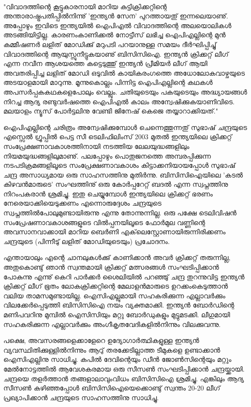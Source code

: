 ﻿
\vskip 2pt

‌\begin{framed}
"വിവാദത്തിന്റെ കൂട്ടുകാരനായി മാറിയ കുട്ടിക്രിക്കറ്റിന്റെ അന്താരാഷ്ട്രപതിപ്പില്‍നിന്നു് 'ഇന്ത്യന്‍ സേന' പുറത്തായതു് 
ഇന്നലെയാണു്. അപ്പോഴും ഇവിടെ ഇന്ത്യയില്‍ ഐപിഎല്‍ വിവാദത്തിന്റെ അലയൊലികള്‍ അടങ്ങിയിട്ടില്ല. 
കാരണംകാണിക്കല്‍ നോട്ടീസ് ലഭിച്ച ഐപിഎല്ലിന്റെ മുന്‍ കമ്മീഷണര്‍ ലളിത് മോഡിക്കു് മറുപടി പറയാനുള്ള 
സമയം ദീര്‍ഘിപ്പിച്ചു് വിവാദത്തിന്റെ ആയുസ്സുനീട്ടുകയാണു് ബിസിസിഐ. ഇന്ത്യന്‍ ക്രിക്കറ്റ് ലീഗ് എന്ന നവീന 
ആശയത്തെ കട്ടെടുത്തു് ഇന്ത്യന്‍ പ്രീമിയര്‍ ലീഗ് ആയി അവതരിപ്പിച്ച ലളിത് മോഡി ഒടുവില്‍ കായികരംഗത്തെ 
അധോലോകവാഴ്ചയുടെ അടയാളമായി മാറുന്നു. മൂന്നുകൊല്ലം പിന്നിട്ട ഐപിഎല്ലിന്റെ കഥകള്‍ 
അപസര്‍പ്പകകഥകളെപോലും വെല്ലും. ചതിയുടെയും പകയുടെയും അദ്ധ്യായങ്ങള്‍ നിറച്ച ആദ്യ രണ്ടുവര്‍ഷത്തെ ഐപിഎല്‍ കാലം 
അന്വേഷിക്കുകയാണിവിടെ.  മലയാളം ന്യൂസ് പോര്‍ട്ടലിനു വേണ്ടി ജിനേഷ് കെജെ തയ്യാറാക്കിയത്."
\end{framed}

{\vskip 12pt}

ഐപിഎല്ലിന്റെ ചരിത്രം അന്വേഷിക്കുമ്പോള്‍ ചെന്നെത്തുന്നതു് സുഭാഷ് ചന്ദ്രയുടെ എസ്സെല്‍ ഗ്രൂപ്പില്‍ പെട്ട സീ ടെലിഫിലിംസ് 
2003 മുതല്‍ ഇന്ത്യയിലെ ക്രിക്കറ്റ് സംപ്രേക്ഷണാവകാശത്തിനായി നടത്തിയ ലേലയുദ്ധങ്ങളിലും നിയമയുദ്ധങ്ങളിലുമാണു്. 
പലപ്പോഴും പൊതുജനത്തെ അമ്പരപ്പിക്കുന്ന നടപടിക്രമങ്ങളിലൂടെ സംപ്രേക്ഷണാവകാശം കിട്ടാക്കനിയായപ്പോള്‍ 
സുഭാഷ് ചന്ദ്ര അസാധ്യമായ ഒരു സാഹസത്തിനു മുതിര്‍ന്നു. ബിസിസിഐയിലെ 'കടല്‍ കിഴവന്‍മാരുടെ' സംഘത്തിനു് 
ഒരു കോര്‍പ്പറേറ്റ് ബദല്‍ എന്ന സ്വപ്നത്തിനു നിറംപകരാന്‍ ശ്രമിച്ചു. ഇതു ചെയ്യുമ്പോള്‍ ഇന്ത്യയിലെ ക്രിക്കറ്റ് ഭരണം 
നേരെയാക്കിയെടുക്കണം എന്നൊരുദ്ദേശം ചന്ദ്രയുടെ സ്വപ്നത്തില്‍പോലുമുണ്ടായിരുന്നു എന്നു തോന്നുന്നില്ല. ഒരു പക്ഷേ 
ടെലിവിഷന്‍ സംപ്രേഷണാവകാശങ്ങളുടെ വില്‍പ്പനയിലൂടെ ഫോര്‍മുല വണ്ണിന്റെ അവസാനവാക്കായി മാറിയ ബെര്‍ണി 
എക്‌ലെസ്റ്റോണായിരുന്നിരിക്കണം ചന്ദ്രയുടെ (പിന്നീടു് ലളിത് മോഡിയുടെയും) പ്രചോദനം.

എന്തായാലും എന്റെ ചാനലുകള്‍ക്കു് കാണിക്കാന്‍ അവര്‍ ക്രിക്കറ്റ് തരുന്നില്ല, അതുകൊണ്ടു് ഞാന്‍ സ്വന്തമായി 
ക്രിക്കറ്റ് മത്സരങ്ങള്‍ സംഘടിപ്പിക്കാന്‍ പോകുന്നു എന്നു് കെറി പാര്‍ക്കര്‍ ശൈലിയില്‍ പറഞ്ഞു് ചന്ദ്ര തുറന്നുവിട്ട ഇന്ത്യന്‍ 
ക്രിക്കറ്റ് ലീഗ് ഭൂതം ലോകക്രിക്കറ്റിന്റെ മേലാളന്‍മാരുടെ ഉറക്കംകെടുത്താന്‍ വലിയ താമസമുണ്ടായില്ല. ഐസിഎല്ലുമായി 
സഹകരിക്കുന്ന എല്ലാവര്‍ക്കും വിലക്കേര്‍പ്പെടുത്തി ബിസിസിഐ നയം വ്യക്തമാക്കി. ഇന്ത്യന്‍ ബോര്‍ഡിന്റെ മണിപവറിനു 
മുമ്പില്‍ ഐസിസിയും മറ്റു ബോര്‍ഡുകളും മുട്ടുമടക്കി. ലീഗുമായി സഹകരിക്കുന്ന എല്ലാവര്‍ക്കും അംഗീകൃതവേദികളില്‍നിന്നും 
വിലക്കുവന്നു.

പക്ഷെ, അവസരങ്ങളെക്കാളേറെ ഉദ്യോഗാര്‍ത്ഥികളുള്ള ഇന്ത്യന്‍ വ്യവസ്ഥിതിക്കുള്ളില്‍നിന്നും ആറു് തരക്കേടില്ലാത്ത 
ടീമുകളെ ഉണ്ടാക്കാന്‍ ഐസിഎല്ലിനു സാധിച്ചു. കപില്‍ ദേവിന്റെയും ഡീന്‍ ജോണ്‍സിന്റെയും മറ്റും മേല്‍നോട്ടത്തില്‍ 
ആവേശകരമായ ഒരു സീസണ്‍ സംഘടിപ്പിക്കാന്‍ ചന്ദ്രയ്ക്കായി. ചന്ദ്രയെ തളര്‍ത്താന്‍ തങ്ങളാലാവുംവിധം ബിസിസിഐ 
ശ്രമിച്ചു. എങ്കിലും ആദ്യ സീസണ്‍ കഴിഞ്ഞപ്പോള്‍ ബിസിസിഐയെക്കൊണ്ടു് സ്വന്തം 20-20 ലീഗ് പ്രഖ്യാപിക്കാന്‍ ചന്ദ്രയുടെ 
സാഹസത്തിനു സാധിച്ചു.

